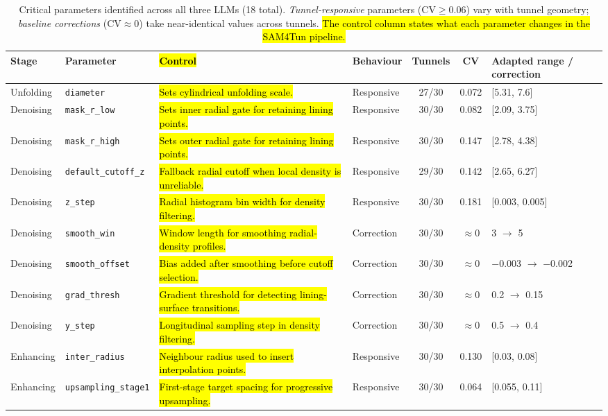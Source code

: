 \documentclass[a4paper,fleqn]{cas-dc}
\begin{document}
\begin{table}[t]
\caption{Critical parameters identified across all three LLMs (18 total). \emph{Tunnel-responsive} parameters ($\text{CV} \geq 0.06$) vary with tunnel geometry; \emph{baseline corrections} ($\text{CV} \approx 0$) take near-identical values across tunnels. \hl{The control column states what each parameter changes in the SAM4Tun pipeline.}}\label{tab:critical-params}
\begin{tabular*}{\textwidth}{@{\extracolsep{\fill}} l l p{} l c c l @{}}
\toprule
Stage & Parameter & \hl{Control} & Behaviour & Tunnels & CV & Adapted range / correction \\
\midrule
Unfolding & \texttt{diameter} & \hl{Sets cylindrical unfolding scale.} & Responsive & 27/30 & 0.072 & [5.31, 7.6] \\
\midrule
Denoising & \texttt{mask\_r\_low} & \hl{Sets inner radial gate for retaining lining points.} & Responsive & 30/30 & 0.082 & [2.09, 3.75] \\
Denoising & \texttt{mask\_r\_high} & \hl{Sets outer radial gate for retaining lining points.} & Responsive & 30/30 & 0.147 & [2.78, 4.38] \\
Denoising & \texttt{default\_cutoff\_z} & \hl{Fallback radial cutoff when local density is unreliable.} & Responsive & 29/30 & 0.142 & [2.65, 6.27] \\
Denoising & \texttt{z\_step} & \hl{Radial histogram bin width for density filtering.} & Responsive & 30/30 & 0.181 & [0.003, 0.005] \\
Denoising & \texttt{smooth\_win} & \hl{Window length for smoothing radial-density profiles.} & Correction & 30/30 & $\approx$0 & 3 $\rightarrow$ 5 \\
Denoising & \texttt{smooth\_offset} & \hl{Bias added after smoothing before cutoff selection.} & Correction & 30/30 & $\approx$0 & $-$0.003 $\rightarrow$ $-$0.002 \\
Denoising & \texttt{grad\_thresh} & \hl{Gradient threshold for detecting lining-surface transitions.} & Correction & 30/30 & $\approx$0 & 0.2 $\rightarrow$ 0.15 \\
Denoising & \texttt{y\_step} & \hl{Longitudinal sampling step in density filtering.} & Correction & 30/30 & $\approx$0 & 0.5 $\rightarrow$ 0.4 \\
\midrule
Enhancing & \texttt{inter\_radius} & \hl{Neighbour radius used to insert interpolation points.} & Responsive & 30/30 & 0.130 & [0.03, 0.08] \\
Enhancing & \texttt{upsampling\_stage1} & \hl{First-stage target spacing for progressive upsampling.} & Responsive & 30/30 & 0.064 & [0.055, 0.11] \\

\end{tabular*}
\end{table}
\end{document}
